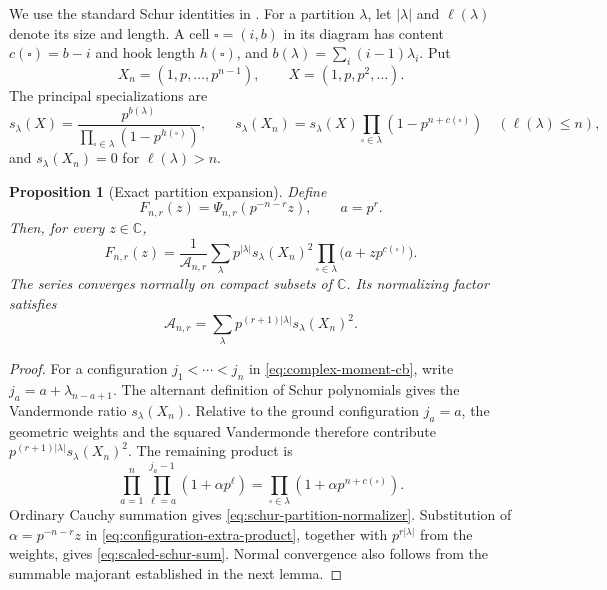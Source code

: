 \documentclass[11pt]{article}
\numberwithin{equation}{section}
\newtheorem{proposition}[proposition]{Proposition}
\theoremstyle{definition}
\theoremstyle{remark}
\newcommand{\C}{\mathbb{C}}
\begin{document}
We use the standard Schur identities in \cite[Chapter~I]{Macdonald}.
For a partition $\lambda$, let $|\lambda|$ and $\ell(\lambda)$ denote
its size and length. A cell $\square=(i,b)$ in its diagram has content
$c(\square)=b-i$ and hook length $h(\square)$, and
$b(\lambda)=\sum_i(i-1)\lambda_i$. Put
\[
 X_n=(1,p,\ldots,p^{n-1}),\qquad X=(1,p,p^2,\ldots).
\]
The principal specializations are
\begin{equation}\label{eq:principal-schur-specialization}
 s_\lambda(X)=
 \frac{p^{b(\lambda)}}{\prod_{\square\in\lambda}(1-p^{h(\square)})},
 \qquad
 s_\lambda(X_n)=s_\lambda(X)
 \prod_{\square\in\lambda}(1-p^{n+c(\square)})
 \quad(\ell(\lambda)\le n),
\end{equation}
and $s_\lambda(X_n)=0$ for $\ell(\lambda)>n$.

\begin{proposition}[Exact partition expansion]\label{prop:schur-representation}
Define
\begin{equation}\label{eq:scaled-F-definition}
 F_{n,r}(z)=\Psi_{n,r}(p^{-n-r}z),\qquad a=p^r.
\end{equation}
Then, for every $z\in\C$,
\begin{equation}\label{eq:scaled-schur-sum}
 F_{n,r}(z)=\frac{1}{\mathcal A_{n,r}}
 \sum_{\lambda}p^{|\lambda|}s_\lambda(X_n)^2
 \prod_{\square\in\lambda}\bigl(a+zp^{c(\square)}\bigr).
\end{equation}
The series converges normally on compact subsets of $\C$. Its
normalizing factor satisfies
\begin{equation}\label{eq:schur-partition-normalizer}
 \mathcal A_{n,r}
 =\sum_\lambda p^{(r+1)|\lambda|}s_\lambda(X_n)^2.
\end{equation}
\end{proposition}

\begin{proof}
For a configuration $j_1<\cdots<j_n$ in
\eqref{eq:complex-moment-cb}, write
$j_a=a+\lambda_{n-a+1}$. The alternant definition of Schur polynomials
gives the Vandermonde ratio $s_\lambda(X_n)$. Relative to the ground
configuration $j_a=a$, the geometric weights and the squared
Vandermonde therefore contribute
$p^{(r+1)|\lambda|}s_\lambda(X_n)^2$. The remaining product is
\begin{equation}\label{eq:configuration-extra-product}
 \prod_{a=1}^n\prod_{\ell=a}^{j_a-1}(1+\alpha p^\ell)
 =\prod_{\square\in\lambda}(1+\alpha p^{n+c(\square)}).
\end{equation}
Ordinary Cauchy summation gives
\eqref{eq:schur-partition-normalizer}. Substitution of
$\alpha=p^{-n-r}z$ in \eqref{eq:configuration-extra-product}, together
with $p^{r|\lambda|}$ from the weights, gives
\eqref{eq:scaled-schur-sum}. Normal convergence also follows from the
summable majorant established in the next lemma.
\end{proof}
\end{document}
